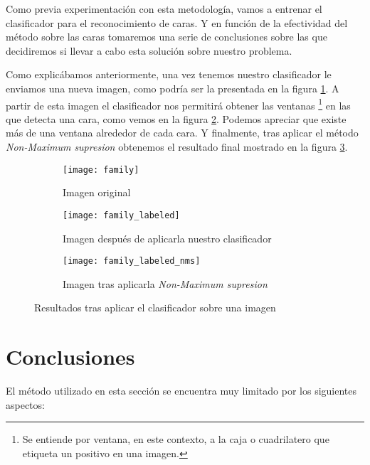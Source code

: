 Como previa experimentación con esta metodología, vamos a entrenar el clasificador para el reconocimiento de caras. Y en función de la efectividad del método sobre las caras tomaremos una serie de conclusiones sobre las que decidiremos si llevar a cabo esta solución sobre  nuestro problema.

Como explicábamos anteriormente, una vez tenemos nuestro clasificador le enviamos una nueva imagen, como podría ser la presentada en la figura \ref{subfig:family}. A partir de esta imagen el clasificador nos permitirá obtener las ventanas \footnote{Se entiende por ventana, en este contexto, a la caja o cuadrilatero que etiqueta un positivo en una imagen.} en las que detecta una cara, como vemos en la figura \ref{subfig:family_labeled}. Podemos apreciar que existe más de una ventana alrededor de cada cara. Y finalmente, tras aplicar el método \textit{Non-Maximum supresion} obtenemos el resultado final mostrado en la figura \ref{subfig:family_labeled_nms}.

\begin{figure}
	\centering
	\begin{subfigure}[b]{0.45\textwidth}
        \texttt{[image: family]}
        \caption{Imagen original}
        \label{subfig:family}
    \end{subfigure}
    \begin{subfigure}[b]{0.45\textwidth}
        \texttt{[image: family\_labeled]}
        \caption{Imagen después de aplicarla nuestro clasificador}
        \label{subfig:family_labeled}
    \end{subfigure}
    \begin{subfigure}[b]{0.45\textwidth}
        \texttt{[image: family\_labeled\_nms]}
        \caption{Imagen tras aplicarla \textit{Non-Maximum supresion}}
         \label{subfig:family_labeled_nms}
    \end{subfigure}
        \caption{Resultados tras aplicar el clasificador sobre una imagen}
	\label{fig:5.1.4}
\end{figure}

\section{Conclusiones}

El método utilizado en esta sección se encuentra muy limitado por los siguientes aspectos:

